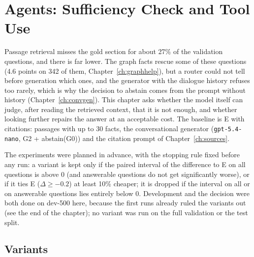 
\chapter{Agents: Sufficiency Check and Tool Use}\label{ch:agents}

Passage retrieval misses the gold section for about 27\% of the validation questions, and \fone{}
there is far lower. The graph facts rescue some of these questions (4.6 points on 342 of them,
Chapter~\ref{ch:graphhelp}), but a router could not tell before generation which ones, and
the generator with the dialogue history refuses too rarely, which is why the decision to
abstain comes from the prompt without history (Chapter~\ref{ch:convgen}). This chapter asks
whether the model itself can judge, after reading the retrieved context, that it is not enough,
and whether looking further repairs the answer at an acceptable cost. The baseline is E with
citations: passages with up to 30 facts, the conversational generator
(\texttt{gpt-5.4-nano}, G2 + abstain(G0)) and the citation prompt of Chapter~\ref{ch:sources}.

The experiments were planned in advance, with the stopping rule fixed before any run: a variant is
kept only if the paired interval of the \fone{} difference to E on all questions is above 0 (and
answerable questions do not get significantly worse), or if it ties E ($\Delta \ge -0.2$) at
least 10\% cheaper; it is dropped if the interval on all or on answerable questions lies entirely
below 0. Development and the decision were both done on dev-500 here, because the first runs
already ruled the variants out (see the end of the chapter); no variant was run on the full validation
or the test split.


\section{Variants}\label{sec:agents:variants}

